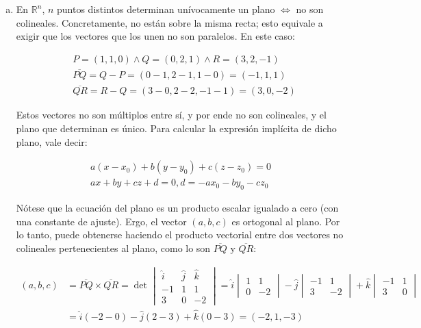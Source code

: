 \documentclass{article}
\renewcommand{\Bbb}{\mathbb}
\begin{document}
\begin{enumerate}[a)]

\item En $\Bbb R^n$, $n$ puntos distintos determinan unívocamente un plano $\Leftrightarrow$ no son colineales. Concretamente, no están sobre la misma recta; esto equivale a exigir que los vectores que los unen no son paralelos. En este caso:

\begin{subequations}
\begin{align}
& P = (1, 1, 0) \wedge Q = (0, 2, 1) \wedge R = (3, 2, -1) \\
& \overline{PQ} = Q - P = (0-1, 2-1, 1-0) = (-1, 1, 1) \\
& \overline{QR} = R - Q = (3-0, 2-2, -1-1) = (3, 0, -2)
\end{align}
\end{subequations}

Estos vectores no son múltiplos entre sí, y por ende no son colineales, y el plano que determinan es único. Para calcular la expresión implícita de dicho plano, vale decir:

\begin{subequations}
\begin{align}
a (x-x_0) + b (y-y_0) + c (z-z_0) = 0 \\
a x + b y + c z + d = 0, d = -a x_0 -b y_0 -c z_0
\end{align}
\end{subequations}

Nótese que la ecuación del plano es un producto escalar igualado a cero (con una constante de ajuste). Ergo, el vector $(a,b,c)$ es ortogonal al plano. Por lo tanto, puede obtenerse haciendo el producto vectorial entre dos vectores no colineales pertenecientes al plano, como lo son $\overline{PQ}$ y $\overline{QR}$:

\begin{subequations}
\begin{align}
(a,b,c) &= \overline{PQ} \times \overline{QR} = \det \begin{vmatrix}
\hat{i} & \hat{j} & \hat{k} \\
-1 & 1 & 1 \\
3 & 0 & -2
\end{vmatrix} = \hat{i} \begin{vmatrix}1 & 1 \\ 0 & -2\end{vmatrix} - \hat{j} \begin{vmatrix}-1 & 1 \\ 3 & -2\end{vmatrix} + \hat{k} \begin{vmatrix}-1 & 1 \\ 3 & 0\end{vmatrix} \\
& = \hat{i} (-2-0) -\hat{j} (2-3) +\hat{k} (0-3) = (-2, 1, -3)
\end{align}
\end{subequations}


\end{enumerate}
\end{document}
